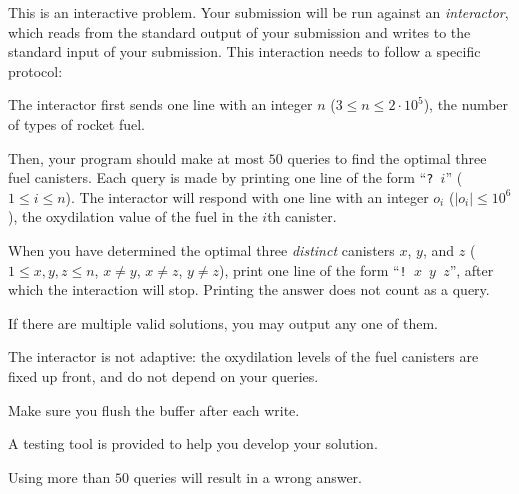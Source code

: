
    This is an interactive problem.
    Your submission will be run against an \emph{interactor},
    which reads from the standard output of your submission
    and writes to the standard input of your submission.
    This interaction needs to follow a specific protocol:

    The interactor first sends
    one line with an integer $n$ ($3\leq n\leq 2 \cdot 10^5$),
    the number of types of rocket fuel.

    Then, your program should make at most $50$ queries to find the optimal three fuel canisters.
    Each query is made by printing one line of the form ``\texttt{?~$i$}'' ($1\leq i\leq n$).
    The interactor will respond with one line with an integer $o_i$ ($|o_i| \leq 10^6$),
    the oxydilation value of the fuel in the $i$th canister.

    When you have determined the optimal three \emph{distinct} canisters $x$, $y$, and $z$
    ($1 \leq x,y,z \leq n$, $x \neq y$, $x \neq z$, $y \neq z$),
    print one line of the form ``\texttt{!~$x$~$y$~$z$}'',
    after which the interaction will stop.
    Printing the answer does not count as a query.

    If there are multiple valid solutions, you may output any one of them.

    The interactor is not adaptive:
    the oxydilation levels of the fuel canisters are fixed up front,
    and do not depend on your queries.

    Make sure you flush the buffer after each write.

    A testing tool is provided to help you develop your solution.

    Using more than $50$ queries will result in a wrong answer.
